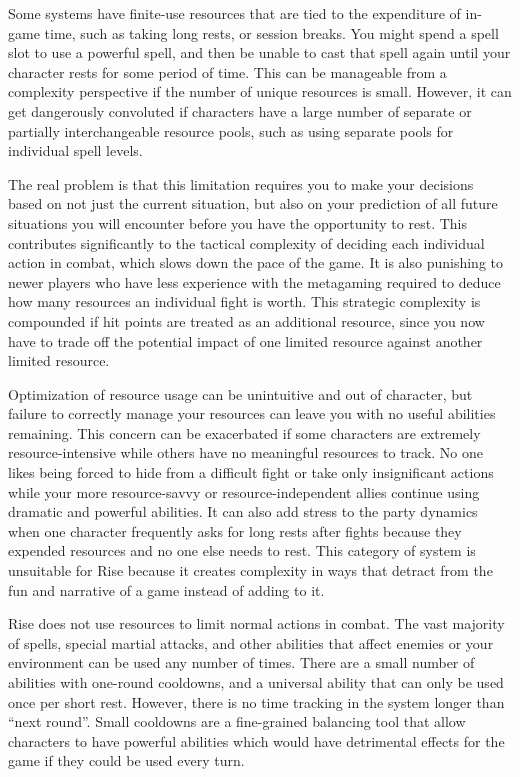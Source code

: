         Some systems have finite-use resources that are tied to the expenditure of in-game time, such as taking long rests, or session breaks.
        You might spend a spell slot to use a powerful spell, and then be unable to cast that spell again until your character rests for some period of time.
        This can be manageable from a complexity perspective if the number of unique resources is small.
        However, it can get dangerously convoluted if characters have a large number of separate or partially interchangeable resource pools, such as using separate pools for individual spell levels.

        The real problem is that this limitation requires you to make your decisions based on not just the current situation, but also on your prediction of all future situations you will encounter before you have the opportunity to rest.
        This contributes significantly to the tactical complexity of deciding each individual action in combat, which slows down the pace of the game.
        It is also punishing to newer players who have less experience with the metagaming required to deduce how many resources an individual fight is worth.
        This strategic complexity is compounded if hit points are treated as an additional resource, since you now have to trade off the potential impact of one limited resource against another limited resource.

        Optimization of resource usage can be unintuitive and out of character, but failure to correctly manage your resources can leave you with no useful abilities remaining.
        This concern can be exacerbated if some characters are extremely resource-intensive while others have no meaningful resources to track.
        No one likes being forced to hide from a difficult fight or take only insignificant actions while your more resource-savvy or resource-independent allies continue using dramatic and powerful abilities.
        It can also add stress to the party dynamics when one character frequently asks for long rests after fights because they expended resources and no one else needs to rest.
        This category of system is unsuitable for Rise because it creates complexity in ways that detract from the fun and narrative of a game instead of adding to it.

        Rise does not use resources to limit normal actions in combat.
        The vast majority of spells, special martial attacks, and other abilities that affect enemies or your environment can be used any number of times.
        There are a small number of abilities with one-round cooldowns, and a universal ability that can only be used once per short rest.
        However, there is no time tracking in the system longer than ``next round''.
        Small cooldowns are a fine-grained balancing tool that allow characters to have powerful abilities which would have detrimental effects for the game if they could be used every turn.

